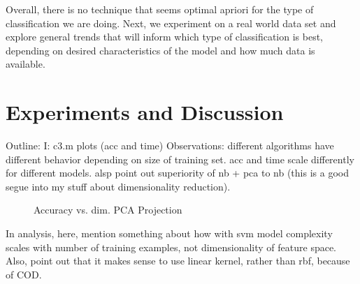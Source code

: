 \documentclass[]{article}
\begin{document}
Overall, there is no technique that seems optimal apriori for the type of classification we are doing. Next, we experiment on a real world data set and explore general trends that will inform which type of classification is best, depending on desired characteristics of the model and how much data is available. 

\section{Experiments and Discussion}
Outline: 
I: c3.m plots (acc and time)
Observations: different algorithms have different behavior depending on size of training set. acc and time scale differently for different models.
alsp point out superiority of nb + pca to nb (this is a good segue into my stuff about dimensionality reduction).



\begin{figure}[h!]
\centering
{}
\caption{Accuracy vs. dim. PCA Projection}
\label{fig:pca_acc_vs_proj_dim}
\end{figure}

In analysis, here, mention something about how with svm model complexity scales with number of training examples, not dimensionality of feature space. Also, point out that it makes sense to use linear kernel, rather than rbf, because of COD. 
\end{document}
